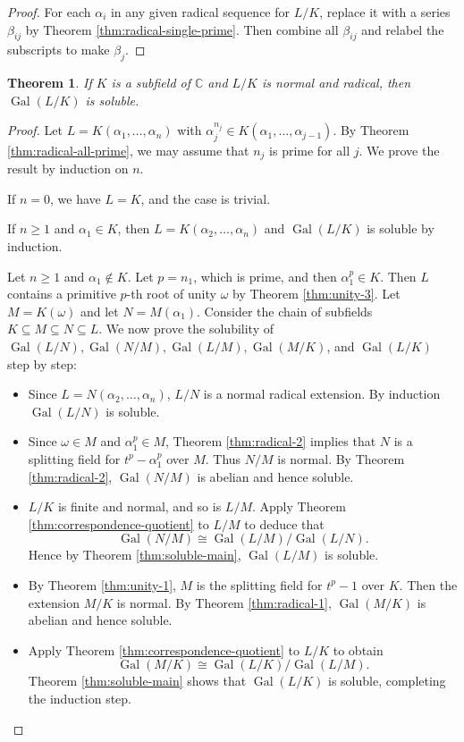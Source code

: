\documentclass[12pt]{article}
\newtheorem{theorem}{Theorem}
\theoremstyle{definition}
\newcommand{\Gal}{\operatorname{Gal}}
\begin{document}
\begin{proof}
    For each $\alpha_i$ in any given radical sequence for $L / K$, replace it with a series $\beta_{ij}$ by Theorem \ref{thm:radical-single-prime}. Then combine all $\beta_{ij}$ and relabel the subscripts to make $\beta_{j}$. 
\end{proof}

\begin{theorem} \label{thm:radical-3}
If $K$ is a subfield of $\mathbb{C}$ and $L / K$ is normal and radical, then $\Gal(L / K)$ is soluble.
\end{theorem}

\begin{proof}
Let $L=K\left(\alpha_1, \ldots, \alpha_n\right)$ with $\alpha_j^{n_j} \in K\left(\alpha_1, \ldots, \alpha_{j-1}\right)$. By Theorem \ref{thm:radical-all-prime}, we may assume that $n_j$ is prime for all $j$. We prove the result by induction on $n$. 

If $n = 0$, we have $L = K$, and the case is trivial.

If $n \ge 1$ and $\alpha_1 \in K$, then $L=K\left(\alpha_2, \ldots, \alpha_n\right)$ and $\Gal(L / K)$ is soluble by induction.

Let $n \ge 1$ and $\alpha_1 \notin K$. Let $p = n_1$, which is prime, and then $\alpha_1^p \in K$.  Then $L$ contains a primitive $p$-th root of unity $\omega$ by Theorem \ref{thm:unity-3}. Let $M = K(\omega)$ and let $N = M(\alpha_1)$. Consider the chain of subfields $K \subseteq M \subseteq N \subseteq L$. We now prove the solubility of $\Gal(L/N), \Gal(N/M), \Gal(L/M), \Gal(M/K)$, and $\Gal(L/K)$ step by step:

\begin{itemize}
    \item Since $L=N\left(\alpha_2, \ldots, \alpha_n\right)$, $L / N$ is a normal radical extension. By induction $\Gal\left(L / N\right)$ is soluble. 
    \item Since $ \omega \in M$ and $\alpha_1^p \in M$, Theorem \ref{thm:radical-2} implies that $N$ is a splitting field for $t^p-\alpha_1^p$ over $M$. Thus $N / M$ is normal. By Theorem \ref{thm:radical-2}, $\Gal\left(N / M\right)$ is abelian and hence soluble. 
    \item  $L/ K$ is finite and normal, and so is $L / M$. Apply Theorem \ref{thm:correspondence-quotient} to $L / M$ to deduce that
    $$
    \Gal\left( N / M \right) \cong \Gal(L / M) / \Gal\left(L / N\right).
    $$
    Hence by Theorem \ref{thm:soluble-main},  $ \Gal(L / M)$ is soluble.
    \item By Theorem \ref{thm:unity-1}, $M$ is the splitting field for $t^p-1$ over $K$. Then the extension $M / K$ is normal. By Theorem \ref{thm:radical-1}, $\Gal(M / K)$ is abelian and hence soluble.
    \item  Apply Theorem \ref{thm:correspondence-quotient} to $L / K$ to obtain
    $$
    \Gal(M / K) \cong \Gal(L / K) / \Gal(L / M). 
    $$
    Theorem \ref{thm:soluble-main} shows that $\Gal(L / K)$ is soluble, completing the induction step.
\end{itemize}
\end{proof}
\end{document}
